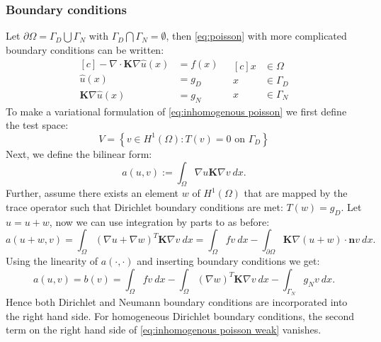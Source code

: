 \documentclass[../Main/main.tex]{subfiles}
\begin{document}
	\subsubsection*{Boundary conditions}
	Let $\partial \Omega = \Gamma_D\bigcup \Gamma_N$ with $\Gamma_D \bigcap \Gamma_N = \emptyset$, then \eqref{eq:poisson} with more complicated boundary conditions can be written:
	\begin{equation}\label{eq:inhomogenous poisson}
		\begin{aligned}[c]
			 - \nabla \cdot \bm{K} \nabla \hat{u}(x) &= f(x) \\
			\hat{u}(x) &= g_D \\
			\bm{K}\nabla \hat{u}(x) &= g_N
		\end{aligned}
		\ \ \
		\begin{aligned}[c]
			x &\in \Omega  \\
			x &\in \Gamma_D \\
			x &\in \Gamma_N
		\end{aligned}
	\end{equation}
	To make a variational formulation of \eqref{eq:inhomogenous poisson} we first define the test space:
	\begin{equation*}
		V = \left \{ v\in H^1(\Omega): T(v)=0 \text{ on }\Gamma_D\right \}
	\end{equation*}
	Next, we define the bilinear form:
	\begin{equation}
		a(u,v) := \int_{\Omega} \nabla u \bm{K} \nabla v \ dx.
	\end{equation}
	Further, assume there exists an element $w$ of $ H^1(\Omega)$ that are mapped by the trace operator such that Dirichlet boundary conditions are met: $T(w)=g_D$. Let $\hat{u} = u+w$, now we can use integration by parts to as before:
	\begin{equation}
		a(u+w,v) = \int_{\Omega}(\nabla u+\nabla w)^{T}\bm{K} \nabla v \ dx = \int_{\Omega}fv \ dx -\int_{\partial\Omega}\bm{K}\nabla (u+w)\cdot \bm{n}v \ dx .
	\end{equation}
	Using the linearity of $a(\cdot,\cdot)$ and inserting boundary conditions we get:
	\begin{equation}\label{eq:inhomogenous poisson weak}
		a(u,v) = b(v)= \int_{\Omega} fv \ dx - \int_{\Omega}(\nabla w)^T\bm{K} \nabla v \ dx - \int_{\Gamma_N} g_N v \ dx.
	\end{equation}
	Hence both Dirichlet and Neumann boundary conditions are incorporated into the right hand side. For homogeneous Dirichlet boundary conditions, the second term on the right hand side of \eqref{eq:inhomogenous poisson weak} vanishes. 
	
\end{document}
